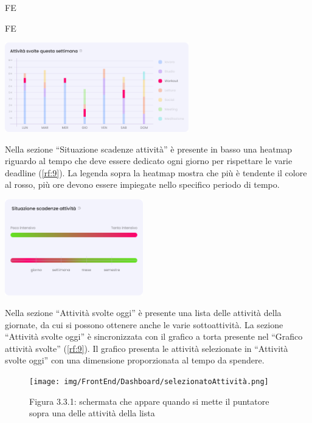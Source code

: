 \begin{listaPersonale}{FE}
\begin{listaPersonale2}{FE}
        \begin{center}
            \includegraphics[width=0.6\textwidth,height=0.18\textheight]{img/FrontEnd/Dashboard/graficoBarre.png} %
        \end{center}
        \pagebreak
        Nella sezione “Situazione scadenze attività” è presente in basso una heatmap riguardo al tempo che deve essere dedicato ogni giorno per rispettare le varie deadline (\ref{rf:9}). La legenda sopra la heatmap mostra che più è tendente il colore al rosso, più ore devono essere impiegate nello specifico periodo di tempo.
        \begin{center}
            \includegraphics[width=0.45\textwidth,height=0.18\textheight]{img/FrontEnd/Dashboard/heatMap.png} %
        \end{center}

        
         Nella sezione “Attività svolte oggi” è presente una lista delle attività della giornate, da cui si possono ottenere anche le varie sottoattività. 
        La sezione “Attività svolte oggi” è sincronizzata con il grafico a torta presente nel “Grafico attività svolte” (\ref{rf:9}). Il grafico presenta le attività selezionate in “Attività svolte oggi” con una dimensione proporzionata al tempo da spendere.

        \begin{figure}[H]
            \centering
            \texttt{[image: img/FrontEnd/Dashboard/selezionatoAttività.png]}
            \caption{Figura 3.3.1: schermata che appare quando si mette il puntatore sopra una delle attività della lista}
        \end{figure}


\end{listaPersonale2}
\end{listaPersonale}
